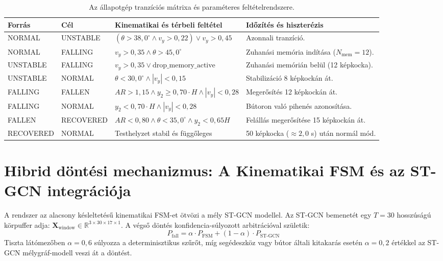 \documentclass[12pt,a4paper,oneside]{report}
\begin{document}
\begin{table}[H]
\centering
\small
\begin{tabularx}{\textwidth}{llp{6.0cm}X}
\toprule
\textbf{Forrás} & \textbf{Cél} & \textbf{Kinematikai és térbeli feltétel} & \textbf{Időzítés és hiszterézis} \\
\midrule
NORMAL & UNSTABLE & $(\theta > 38{,}0^\circ \land v_y > 0{,}22) \lor v_y > 0{,}45$ & Azonnali tranzíció. \\
NORMAL & FALLING & $v_y > 0{,}35 \land \theta > 45{,}0^\circ$ & Zuhanási memória indítása ($N_{\text{mem}}=12$). \\
UNSTABLE & FALLING & $v_y > 0{,}35 \lor \text{drop\_memory\_active}$ & Zuhanási memórián belül (12 képkocka). \\
UNSTABLE & NORMAL & $\theta < 30{,}0^\circ \land |v_y| < 0{,}15$ & Stabilizáció 8 képkockán át. \\
FALLING & FALLEN & $AR > 1{,}15 \land y_2 \ge 0{,}70 \cdot H \land |v_y| < 0{,}28$ & Megerősítés 12 képkockán át. \\
FALLING & NORMAL & $y_2 < 0{,}70 \cdot H \land |v_y| < 0{,}28$ & Bútoron való pihenés azonosítása. \\
FALLEN & RECOVERED & $AR < 0{,}80 \land \theta < 35{,}0^\circ \land y_2 < 0{,}65 H$ & Felállás megerősítése 15 képkockán át. \\
RECOVERED & NORMAL & Testhelyzet stabil és függőleges & 50 képkocka ($\approx 2{,}0$ s) után normál mód. \\
\bottomrule
\end{tabularx}
\caption{Az állapotgép tranzíciós mátrixa és paraméteres feltételrendszere.}
\label{tab:fsm_transitions}
\end{table}

\section{Hibrid döntési mechanizmus: A Kinematikai FSM és az ST-GCN integrációja}
A rendszer az alacsony késleltetésű kinematikai FSM-et ötvözi a mély ST-GCN modellel. Az ST-GCN bemenetét egy $T=30$ hosszúságú körpuffer adja: $\mathbf{X}_{\text{window}} \in \mathbb{R}^{3 \times 30 \times 17 \times 1}$. A végső döntés konfidencia-súlyozott arbitrációval születik:
\begin{equation}
    P_{\text{fall}} = \alpha \cdot P_{\text{FSM}} + (1 - \alpha) \cdot P_{\text{ST-GCN}}
\end{equation}
Tiszta látómezőben $\alpha = 0{,}6$ súlyozza a determinisztikus szűrőt, míg segédeszköz vagy bútor általi kitakarás esetén $\alpha = 0{,}2$ értékkel az ST-GCN mélygráf-modell veszi át a döntést.
\end{document}
